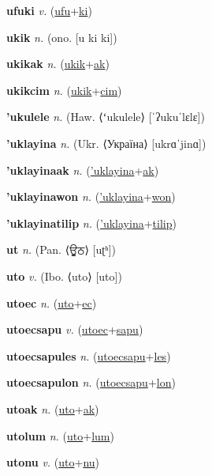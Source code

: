 \textbf{\hypertarget{ufuki}{ufuki}} \textit{v.} (\hyperlink{ufu}{ufu}+\allowbreak \hyperlink{ki}{ki})


\textbf{\hypertarget{ukik}{ukik}} \textit{n.} (ono. [u ki ki])


\textbf{\hypertarget{ukikak}{ukikak}} \textit{n.} (\hyperlink{ukik}{ukik}+\allowbreak \hyperlink{ak}{ak})


\textbf{\hypertarget{ukikcim}{ukikcim}} \textit{n.} (\hyperlink{ukik}{ukik}+\allowbreak \hyperlink{cim}{cim})


\textbf{\hypertarget{'ukulele}{'ukulele}} \textit{n.} (Haw. ⟨ʻukulele⟩ [ˈʔukuˈlɛlɛ])


\textbf{\hypertarget{'uklayina}{'uklayina}} \textit{n.} (Ukr. ⟨Україна⟩ [ukrɑˈjinɑ])


\textbf{\hypertarget{'uklayinaak}{'uklayinaak}} \textit{n.} (\hyperlink{'uklayina}{'uklayina}+\allowbreak \hyperlink{ak}{ak})


\textbf{\hypertarget{'uklayinawon}{'uklayinawon}} \textit{n.} (\hyperlink{'uklayina}{'uklayina}+\allowbreak \hyperlink{won}{won})


\textbf{\hypertarget{'uklayinatilip}{'uklayinatilip}} \textit{n.} (\hyperlink{'uklayina}{'uklayina}+\allowbreak \hyperlink{tilip}{tilip})


\textbf{\hypertarget{ut}{ut}} \textit{n.} (Pan. ⟨{\gurmukhi{}ਊਠ}⟩ [uʈʰ])


\textbf{\hypertarget{uto}{uto}} \textit{v.} (Ibo. ⟨uto⟩ [uto])


\textbf{\hypertarget{utoec}{utoec}} \textit{n.} (\hyperlink{uto}{uto}+\allowbreak \hyperlink{ec}{ec})


\textbf{\hypertarget{utoecsapu}{utoecsapu}} \textit{v.} (\hyperlink{utoec}{utoec}+\allowbreak \hyperlink{sapu}{sapu})


\textbf{\hypertarget{utoecsapules}{utoecsapules}} \textit{n.} (\hyperlink{utoecsapu}{utoecsapu}+\allowbreak \hyperlink{les}{les})


\textbf{\hypertarget{utoecsapulon}{utoecsapulon}} \textit{n.} (\hyperlink{utoecsapu}{utoecsapu}+\allowbreak \hyperlink{lon}{lon})


\textbf{\hypertarget{utoak}{utoak}} \textit{n.} (\hyperlink{uto}{uto}+\allowbreak \hyperlink{ak}{ak})


\textbf{\hypertarget{utolum}{utolum}} \textit{n.} (\hyperlink{uto}{uto}+\allowbreak \hyperlink{lum}{lum})


\textbf{\hypertarget{utonu}{utonu}} \textit{v.} (\hyperlink{uto}{uto}+\allowbreak \hyperlink{nu}{nu})


